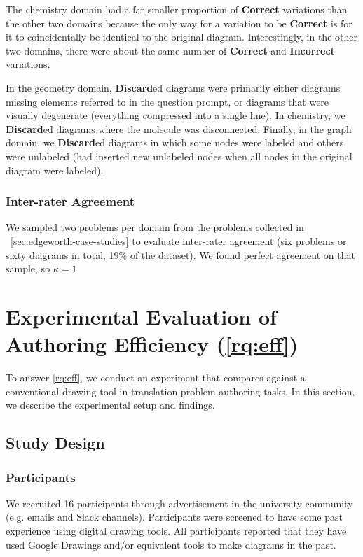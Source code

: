 The chemistry domain had a far smaller proportion of \textbf{Correct} variations than the other two domains because the only way for a variation to be \textbf{Correct} is for it to coincidentally be identical to the original diagram. Interestingly, in the other two domains, there were about the same number of \textbf{Correct} and \textbf{Incorrect} variations.

In the geometry domain, \textbf{Discard}ed diagrams were primarily either diagrams missing elements referred to in the question prompt, or diagrams that were visually degenerate (\eg everything compressed into a single line). In chemistry, we \textbf{Discard}ed diagrams where the molecule was disconnected. Finally, in the graph domain, we \textbf{Discard}ed diagrams in which some nodes were labeled and others were unlabeled (\ie \Edgeworth had inserted new unlabeled nodes when all nodes in the original diagram were labeled).

\subsubsection{Inter-rater Agreement}

We sampled two problems per domain from the problems collected in ~\cref{sec:edgeworth-case-studies} to evaluate inter-rater agreement (six problems or sixty diagrams in total, 19\% of the dataset). We found perfect agreement on that sample, so $\kappa = 1$.

\section{Experimental Evaluation of Authoring Efficiency (\ref{rq:eff})}
\label{sec:edgeworth-user-study}

To answer \ref{rq:eff}, we conduct an experiment that compares \Edgeworth against a conventional drawing tool in translation problem authoring tasks. In this section, we describe the experimental setup and findings.

\subsection{Study Design}


\subsubsection{Participants}

We recruited 16 participants through advertisement in the university community (e.g. emails and Slack channels). Participants were screened to have some past experience using digital drawing tools. All participants reported that they have used Google Drawings and/or equivalent tools to make diagrams in the past.

